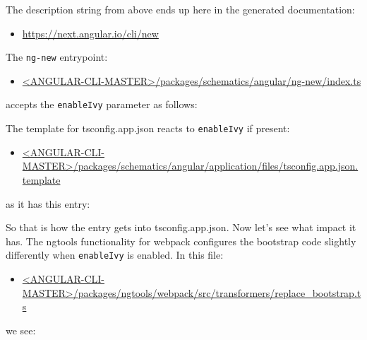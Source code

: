 

The description string from above ends up here in the generated documentation:

\begin{itemize}
  \item \url{https://next.angular.io/cli/new}
\end{itemize}

The
\texttt{ng-new}
entrypoint:

\begin{itemize}
  \item \href{https://github.com/angular/angular-cli/blob/master/packages/schematics/angular/ng-new/index.ts}
        {<ANGULAR-CLI-MASTER>/packages/schematics/angular/ng-new/index.ts}
\end{itemize}

accepts the
\texttt{enableIvy}
parameter as follows:



The template for tsconfig.app.json reacts to
\texttt{enableIvy}
if present:

\begin{itemize}
  \item \href{https://github.com/angular/angular-cli/blob/master/packages/schematics/angular/application/files/tsconfig.app.json.template}
        {<ANGULAR-CLI-MASTER>/packages/schematics/angular/application/files/tsconfig.app.json.template}
\end{itemize}

as it has this entry:



So that is how the entry gets into tsconfig.app.json. Now let’s see what impact it has.
The ngtools functionality for webpack configures the bootstrap code slightly differently
when
\texttt{enableIvy}
is enabled. In this file:

\begin{itemize}
  \item \href{https://github.com/angular/angular-cli/blob/master/packages/ngtools/webpack/src/transformers/replace_bootstrap.ts}
        {<ANGULAR-CLI-MASTER>/packages/ngtools/webpack/src/transformers/replace\_bootstrap.ts}
\end{itemize}

we see:



